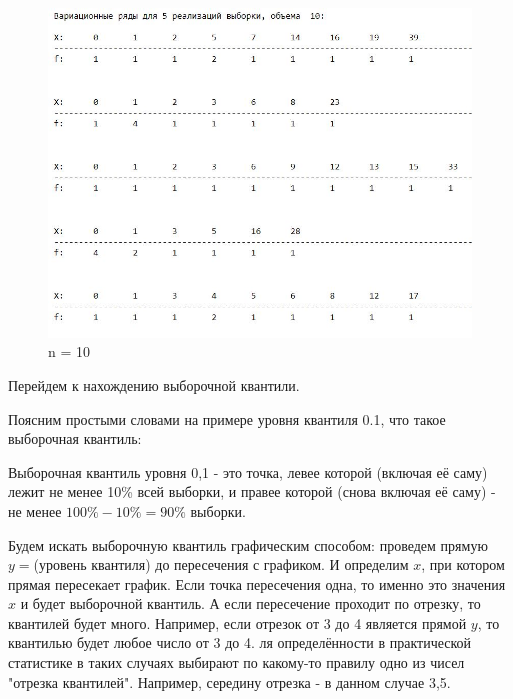 \documentclass[a4paper,12pt, oneside]{book}
\begin{document}
\begin{figure}[h!]
\begin{center}
\begin{minipage}[h]{0.4\linewidth}
			\includegraphics[width=1\linewidth]{var_ser_10.jpg}	
			\caption{n = 10} %
		\end{minipage}

	\end{center}
\end{figure}


\vspace{5mm}



\newpage

	Перейдем к нахождению выборочной квантили.
	
	Поясним простыми словами на примере уровня квантиля  0.1, что такое выборочная квантиль:
	
	\vspace{3mm}
	Выборочная квантиль уровня 0,1 - это точка, левее которой (включая её саму) лежит не менее 10\% всей выборки, и правее которой (снова включая её саму) - не менее $100\%-10\%=90\%$ выборки.
	\vspace{5mm}
	
	 Будем искать выборочную квантиль графическим способом: проведем прямую $y =$(уровень квантиля) до пересечения с графиком. И определим  $x$, при котором прямая пересекает график. Если точка пересечения одна, то именно это значения $x$ и будет выборочной квантиль. А если пересечение проходит по отрезку, то квантилей будет много. Например, если отрезок от 3 до 4 является прямой $y$, то квантилью будет любое число от 3 до 4. ля определённости в практической статистике в таких случаях выбирают по какому-то правилу одно из чисел "отрезка квантилей". Например, середину отрезка - в данном случае 3,5.
	 
\end{document}
